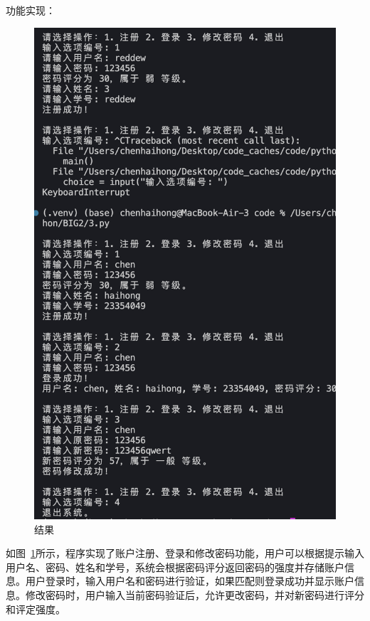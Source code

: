 \documentclass[12pt,a4paper,oneside]{article}
\begin{document}
\newpage
功能实现：
\begin{figure}[H]
    \centering
    \begin{minipage}{0.4\textwidth}
        \centering
        \includegraphics[width=\textwidth]{image/2} %
        \caption{结果}
        \label{fig:image7}
    \end{minipage}
\end{figure}

如图~\ref{fig:image7}所示，程序实现了账户注册、登录和修改密码功能，用户可以根据提示输入用户名、密码、姓名和学号，系统会根据密码评分返回密码的强度并存储账户信息。用户登录时，输入用户名和密码进行验证，如果匹配则登录成功并显示账户信息。修改密码时，用户输入当前密码验证后，允许更改密码，并对新密码进行评分和评定强度。
\end{document}
